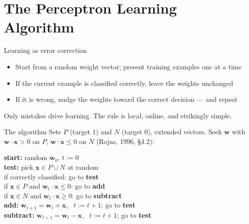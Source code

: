 \documentclass[aspectratio=169, 11pt]{beamer}
\begin{document}
\section{The Perceptron Learning Algorithm}

\begin{frame}{Learning as error correction}
  \begin{itemize}
    \item Start from a random weight vector; present training
          examples one at a time
    \item If the current example is classified
          \alert{correctly}, leave the weights unchanged
    \item If it is \alert{wrong}, nudge the weights toward
          the correct decision --- and repeat
  \end{itemize}
  \vspace{0.3em}
  \begin{redhighlight}
    Only mistakes drive learning. The rule is local, online,
    and strikingly simple.
  \end{redhighlight}
\end{frame}

\begin{frame}{The algorithm}
  Sets $P$ (target $1$) and $N$ (target $0$), extended
  vectors. Seek $\mathbf{w}$ with
  $\mathbf{w}\!\cdot\!\mathbf{x}>0$ on $P$,
  $\mathbf{w}\!\cdot\!\mathbf{x}\le 0$ on $N$
  (Rojas, 1996, \S4.2):
  \vspace{0.2em}
  \begin{tcolorbox}[colback=pcc!4, colframe=pcc!40,
                    boxrule=0.5pt, arc=1mm, left=3mm]
  {\small
  \textbf{start:} random $\mathbf{w}_0$, \; $t:=0$\\[2pt]
  \textbf{test:} pick $\mathbf{x}\in P\cup N$ at random\\
  \quad if correctly classified: go to \textbf{test}\\
  \quad if $\mathbf{x}\in P$ and $\mathbf{w}_t\!\cdot\!\mathbf{x}\le 0$:
        go to \textbf{add}\\
  \quad if $\mathbf{x}\in N$ and $\mathbf{w}_t\!\cdot\!\mathbf{x}\ge 0$:
        go to \textbf{subtract}\\[2pt]
  \textbf{add:} $\mathbf{w}_{t+1}=\mathbf{w}_t+\mathbf{x}$,
        \ $t{:=}t{+}1$; go to \textbf{test}\\[2pt]
  \textbf{subtract:} $\mathbf{w}_{t+1}=\mathbf{w}_t-\mathbf{x}$,
        \ $t{:=}t{+}1$; go to \textbf{test}}
  \end{tcolorbox}
\end{frame}
\end{document}
